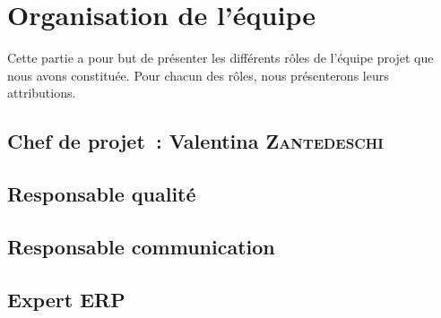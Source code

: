 \chapter{Organisation de l'équipe}
Cette partie a pour but de présenter les différents rôles de l'équipe projet que nous avons constituée. Pour chacun des rôles, nous présenterons leurs attributions.

\section{Chef de projet~: Valentina \textsc{Zantedeschi}}

\section{Responsable qualité}

\section{Responsable communication}

\section{Expert ERP}
